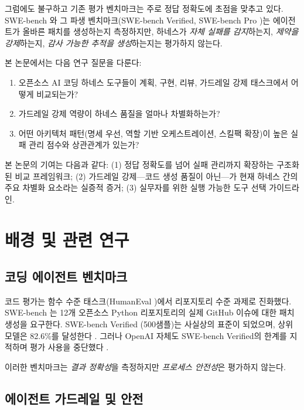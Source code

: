 \documentclass[11pt,a4paper]{article}
\begin{document}
그럼에도 불구하고 기존 평가 벤치마크는 주로 정답 정확도에 초점을 맞추고 있다.
SWE-bench \cite{jimenez2024swebench}와 그 파생 벤치마크(SWE-bench Verified, SWE-bench Pro \cite{deng2025swebenchpro})는 에이전트가 올바른 패치를 생성하는지 측정하지만, 하네스가 \emph{자체 실패를 감지}하는지, \emph{제약을 강제}하는지, \emph{감사 가능한 추적을 생성}하는지는 평가하지 않는다.

본 논문에서는 다음 연구 질문을 다룬다:

\begin{enumerate}[label=\textbf{RQ\arabic*:}]
  \item 오픈소스 AI 코딩 하네스 도구들이 계획, 구현, 리뷰, 가드레일 강제 태스크에서 어떻게 비교되는가?
  \item 가드레일 강제 역량이 하네스 품질을 얼마나 차별화하는가?
  \item 어떤 아키텍처 패턴(명세 우선, 역할 기반 오케스트레이션, 스킬팩 확장)이 높은 실패 관리 점수와 상관관계가 있는가?
\end{enumerate}

\noindent 본 논문의 기여는 다음과 같다:
(1) 정답 정확도를 넘어 실패 관리까지 확장하는 구조화된 비교 프레임워크;
(2) 가드레일 강제---코드 생성 품질이 아닌---가 현재 하네스 간의 주요 차별화 요소라는 실증적 증거;
(3) 실무자를 위한 실행 가능한 도구 선택 가이드라인.

\section{배경 및 관련 연구}
\label{sec:related}

\subsection{코딩 에이전트 벤치마크}

코드 평가는 함수 수준 태스크(HumanEval \cite{chen2021humaneval})에서 리포지토리 수준 과제로 진화했다.
SWE-bench \cite{jimenez2024swebench}는 12개 오픈소스 Python 리포지토리의 실제 GitHub 이슈에 대한 패치 생성을 요구한다.
SWE-bench Verified (500샘플)는 사실상의 표준이 되었으며, 상위 모델은 82.6\%를 달성한다 \cite{vals2026swebench}.
그러나 OpenAI 자체도 SWE-bench Verified의 한계를 지적하며 평가 사용을 중단했다 \cite{openai2026why_not_swebench}.

이러한 벤치마크는 \emph{결과 정확성}을 측정하지만 \emph{프로세스 안전성}은 평가하지 않는다.

\subsection{에이전트 가드레일 및 안전}
\end{document}
